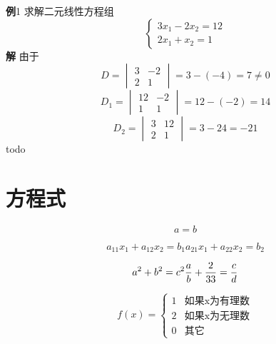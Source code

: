 \textbf{例}1  求解二元线性方程组
\begin{equation*}
  \begin{cases}
    3x_1-2x_2=12\\
    2x_1+x_2=1
  \end{cases}
\end{equation*}
\textbf{解} 由于\\
\begin{equation*}
  D=
  \begin{vmatrix}
    3 & -2\\
    2 & 1
  \end{vmatrix}
  =3-(-4)=7\neq 0
\end{equation*}
\begin{equation*}
  D_1=
  \begin{vmatrix}
    12 & -2\\
    1 & 1
  \end{vmatrix}
  = 12 - (-2) = 14
\end{equation*}
\begin{equation*}
  D_2=
  \begin{vmatrix}
    3 & 12\\
    2 & 1
  \end{vmatrix}
  = 3 - 24 = -21
\end{equation*}
todo
\section{方程式}
\begin{equation*}
  a=b
\end{equation*}


\begin{equation}
  a_{11} x_1+a_{12}x_2 = b_1
  a_{21}x_1+a_{22}x_2 = b_2
\end{equation}

\begin{equation}
  a^2 + b^2 = c^2\\
  \frac{a}{b}+\frac2{33}=\frac{c}{d}
\end{equation}

\begin{equation} f(x) =
  \begin{cases}
    1 & \text{如果x为有理数} \\
    2 & \text{如果x为无理数} \\
    0 & \text{其它}
  \end{cases}
\end{equation}


